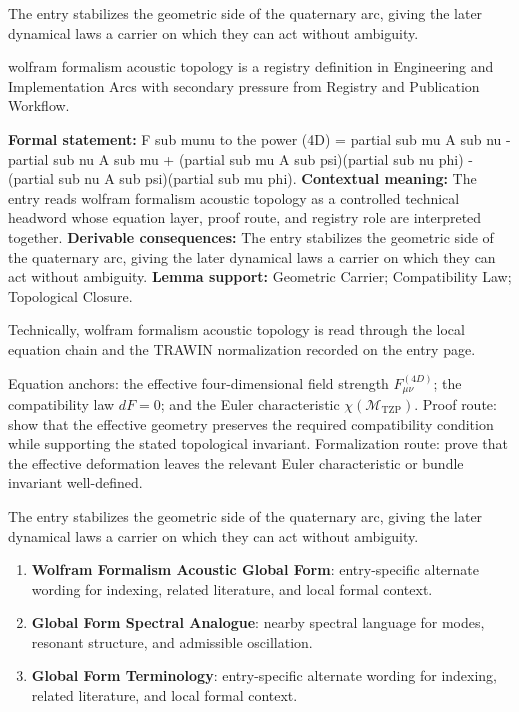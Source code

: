 The entry stabilizes the geometric side of the quaternary arc, giving the later dynamical laws a carrier on which they can act without ambiguity.
\clearpage


\begingroup\small
{}
wolfram formalism acoustic topology is a registry definition in Engineering and Implementation Arcs with secondary pressure from Registry and Publication Workflow.

\begingroup\footnotesize\setlength{\emergencystretch}{3em}\sloppy
\textbf{Formal statement:} F sub munu to the power (4D) = partial sub mu A sub nu - partial sub nu A sub mu + (partial sub mu A sub psi)(partial sub nu phi) - (partial sub nu A sub psi)(partial sub mu phi). \textbf{Contextual meaning:} The entry reads wolfram formalism acoustic topology as a controlled technical headword whose equation layer, proof route, and registry role are interpreted together. \textbf{Derivable consequences:} The entry stabilizes the geometric side of the quaternary arc, giving the later dynamical laws a carrier on which they can act without ambiguity. \textbf{Lemma support:} Geometric Carrier; Compatibility Law; Topological Closure.\par
\endgroup

Technically, wolfram formalism acoustic topology is read through the local equation chain and the TRAWIN normalization recorded on the entry page.

Equation anchors: the effective four-dimensional field strength \(F_{\mu\nu}^{(4D)}\); the compatibility law \(dF=0\); and the Euler characteristic \(\chi(\mathcal{M}_{\mathrm{TZP}})\). Proof route: show that the effective geometry preserves the required compatibility condition while supporting the stated topological invariant. Formalization route: prove that the effective deformation leaves the relevant Euler characteristic or bundle invariant well-defined.

The entry stabilizes the geometric side of the quaternary arc, giving the later dynamical laws a carrier on which they can act without ambiguity.
\endgroup

\begin{enumerate}[leftmargin=1.6em,itemsep=6pt,topsep=4pt]
\item \textbf{Wolfram Formalism Acoustic Global Form}: entry-specific alternate wording for indexing, related literature, and local formal context.
\item \textbf{Global Form Spectral Analogue}: nearby spectral language for modes, resonant structure, and admissible oscillation.
\item \textbf{Global Form Terminology}: entry-specific alternate wording for indexing, related literature, and local formal context.
\end{enumerate}

